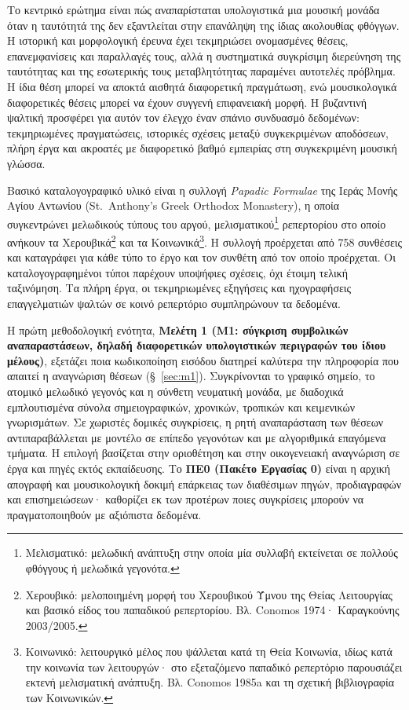 \documentclass[11pt,a4paper]{article}
\begin{document}
Το κεντρικό ερώτημα είναι πώς αναπαρίσταται υπολογιστικά μια μουσική μονάδα όταν η ταυτότητά της δεν εξαντλείται στην επανάληψη της ίδιας ακολουθίας φθόγγων. Η ιστορική και μορφολογική έρευνα έχει τεκμηριώσει ονομασμένες θέσεις, επανεμφανίσεις και παραλλαγές τους, αλλά η συστηματικά συγκρίσιμη διερεύνηση της ταυτότητας και της εσωτερικής τους μεταβλητότητας παραμένει αυτοτελές πρόβλημα. Η ίδια θέση μπορεί να αποκτά αισθητά διαφορετική πραγμάτωση, ενώ μουσικολογικά διαφορετικές θέσεις μπορεί να έχουν συγγενή επιφανειακή μορφή. Η βυζαντινή ψαλτική προσφέρει για αυτόν τον έλεγχο έναν σπάνιο συνδυασμό δεδομένων: τεκμηριωμένες πραγματώσεις, ιστορικές σχέσεις μεταξύ συγκεκριμένων αποδόσεων, πλήρη έργα και ακροατές με διαφορετικό βαθμό εμπειρίας στη συγκεκριμένη μουσική γλώσσα.

Βασικό καταλογογραφικό υλικό είναι η συλλογή \emph{Papadic Formulae} της Ιεράς Μονής Αγίου Αντωνίου (St.~Anthony's Greek Orthodox Monastery), η οποία συγκεντρώνει μελωδικούς τύπους του αργού, μελισματικού\footnote{Μελισματικό: μελωδική ανάπτυξη στην οποία μία συλλαβή εκτείνεται σε πολλούς φθόγγους ή μελωδικά γεγονότα.} ρεπερτορίου στο οποίο ανήκουν τα Χερουβικά\footnote{Χερουβικό: μελοποιημένη μορφή του Χερουβικού Ύμνου της Θείας Λειτουργίας και βασικό είδος του παπαδικού ρεπερτορίου. Βλ. Conomos 1974· Καραγκούνης 2003/2005.} και τα Κοινωνικά\footnote{Κοινωνικό: λειτουργικό μέλος που ψάλλεται κατά τη Θεία Κοινωνία, ιδίως κατά την κοινωνία των λειτουργών· στο εξεταζόμενο παπαδικό ρεπερτόριο παρουσιάζει εκτενή μελισματική ανάπτυξη. Βλ. Conomos 1985a και τη σχετική βιβλιογραφία των Κοινωνικών.}. Η συλλογή προέρχεται από 758 συνθέσεις και καταγράφει για κάθε τύπο το έργο και τον συνθέτη από τον οποίο προέρχεται. Οι καταλογογραφημένοι τύποι παρέχουν υποψήφιες σχέσεις, όχι έτοιμη τελική ταξινόμηση. Τα πλήρη έργα, οι τεκμηριωμένες εξηγήσεις και ηχογραφήσεις επαγγελματιών ψαλτών σε κοινό ρεπερτόριο συμπληρώνουν τα δεδομένα.

Η πρώτη μεθοδολογική ενότητα, \textbf{Μελέτη 1 (M1: σύγκριση συμβολικών αναπαραστάσεων, δηλαδή διαφορετικών υπολογιστικών περιγραφών του ίδιου μέλους)}, εξετάζει ποια κωδικοποίηση εισόδου διατηρεί καλύτερα την πληροφορία που απαιτεί η αναγνώριση θέσεων (§~\ref{sec:m1}). Συγκρίνονται το γραφικό σημείο, το ατομικό μελωδικό γεγονός και η σύνθετη νευματική μονάδα, με διαδοχικά εμπλουτισμένα σύνολα σημειογραφικών, χρονικών, τροπικών και κειμενικών γνωρισμάτων. Σε χωριστές δομικές συγκρίσεις, η ρητή αναπαράσταση των θέσεων αντιπαραβάλλεται με μοντέλο σε επίπεδο γεγονότων και με αλγοριθμικά επαγόμενα τμήματα. Η επιλογή βασίζεται στην οριοθέτηση και στην οικογενειακή αναγνώριση σε έργα και πηγές εκτός εκπαίδευσης. Το \textbf{ΠΕ0 (Πακέτο Εργασίας 0)} είναι η αρχική απογραφή και μουσικολογική δοκιμή επάρκειας των διαθέσιμων πηγών, προδιαγραφών και επισημειώσεων· καθορίζει εκ των προτέρων ποιες συγκρίσεις μπορούν να πραγματοποιηθούν με αξιόπιστα δεδομένα.
\end{document}
